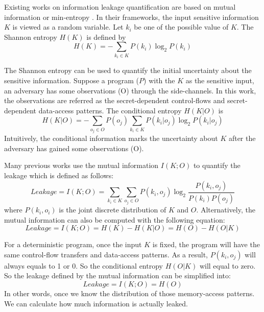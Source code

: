 Existing works on information leakage quantification are based on mutual information or 
min-entropy \cite{10.1007/978-3-642-00596-1_21}.
In their frameworks, the input sensitive
information $K$ is viewed as a random variable. Let $k_i$ be one of the possible
value of $K$. The Shannon entropy $H(K)$ is defined by
\begin{displaymath}
    H(K) = - \sum_{k_i {\in} K}P(k_i)\log_2P(k_i)
\end{displaymath}

The Shannon entropy can be used to quantify the initial uncertainty about the sensitive
information. Suppose a program ($P$) with the $K$ as
the sensitive input, an adversary has some observations (O) through the side-channels.
In this work, the observations are referred as the secret-dependent control-flows and
secret-dependent data-access patterns. The conditional entropy $H(K|O)$ is
\begin{displaymath}
    H(K|O) = - \sum_{o_j {\in} O} {P(o_j) \sum_{k_i {\in} K}{P(k_i|o_j)\log_2P(k_i|o_j)}}
\end{displaymath}
Intuitively, the conditional information marks the uncertainty about $K$ after the adversary
has gained some observations (O). 

Many previous works use the mutual information $I(K; O)$ to quantify the leakage which is defined 
as follows:
\begin{displaymath}
    \mathit{Leakage} = I(K;O) = \sum_{k_i {\in} K}{\sum_{o_j {\in} O}{P(k_i, o_j)\log_2\frac{P(k_i, o_j)}{P(k_i)P(o_j)}}}
\end{displaymath}
where $P(k_i, o_i)$ is the joint discrete distribution of $K$ and $O$.
Alternatively, the mutual information can also be computed with the following equation:
\begin{displaymath}
    \mathit{Leakage} = I(K;O) = H(K) - H(K|O) = H(O) - H(O|K)
\end{displaymath}

For a deterministic program, once the input $K$ is fixed, the program will have the same
control-flow transfers and data-access patterns. As a result, $P(k_i, o_j)$ will always
equals to 1 or 0. So the conditional entropy $H(O|K)$ will equal to zero. So the leakage defined
by the mutual information can be simplified into:
\begin{displaymath}
\label{mutual:information}
    \mathit{Leakage} = I(K;O) = H(O)
\end{displaymath}
In other words, once we know the distribution of those memory-access patterns. We can 
calculate how much information is actually leaked.

